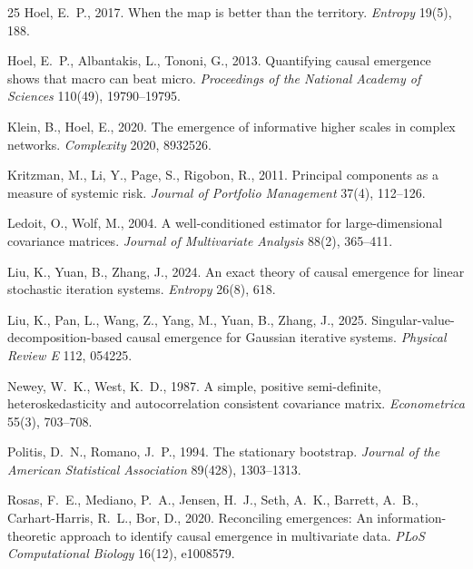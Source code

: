 \documentclass[review,12pt,authoryear]{elsarticle}
\begin{document}
\begin{thebibliography}{25}
Hoel, E.~P., 2017.
\newblock When the map is better than the territory.
\newblock \emph{Entropy} 19(5), 188.

Hoel, E.~P., Albantakis, L., Tononi, G., 2013.
\newblock Quantifying causal emergence shows that macro can beat micro.
\newblock \emph{Proceedings of the National Academy of Sciences} 110(49), 19790--19795.

Klein, B., Hoel, E., 2020.
\newblock The emergence of informative higher scales in complex networks.
\newblock \emph{Complexity} 2020, 8932526.

Kritzman, M., Li, Y., Page, S., Rigobon, R., 2011.
\newblock Principal components as a measure of systemic risk.
\newblock \emph{Journal of Portfolio Management} 37(4), 112--126.

Ledoit, O., Wolf, M., 2004.
\newblock A well-conditioned estimator for large-dimensional covariance matrices.
\newblock \emph{Journal of Multivariate Analysis} 88(2), 365--411.

Liu, K., Yuan, B., Zhang, J., 2024.
\newblock An exact theory of causal emergence for linear stochastic iteration systems.
\newblock \emph{Entropy} 26(8), 618.

Liu, K., Pan, L., Wang, Z., Yang, M., Yuan, B., Zhang, J., 2025.
\newblock Singular-value-decomposition-based causal emergence for {G}aussian iterative systems.
\newblock \emph{Physical Review E} 112, 054225.

Newey, W.~K., West, K.~D., 1987.
\newblock A simple, positive semi-definite, heteroskedasticity and autocorrelation consistent covariance matrix.
\newblock \emph{Econometrica} 55(3), 703--708.

Politis, D.~N., Romano, J.~P., 1994.
\newblock The stationary bootstrap.
\newblock \emph{Journal of the American Statistical Association} 89(428), 1303--1313.

Rosas, F.~E., Mediano, P.~A., Jensen, H.~J., Seth, A.~K., Barrett, A.~B., Carhart-Harris, R.~L., Bor, D., 2020.
\newblock Reconciling emergences: An information-theoretic approach to identify causal emergence in multivariate data.
\newblock \emph{PLoS Computational Biology} 16(12), e1008579.


\end{thebibliography}
\end{document}
